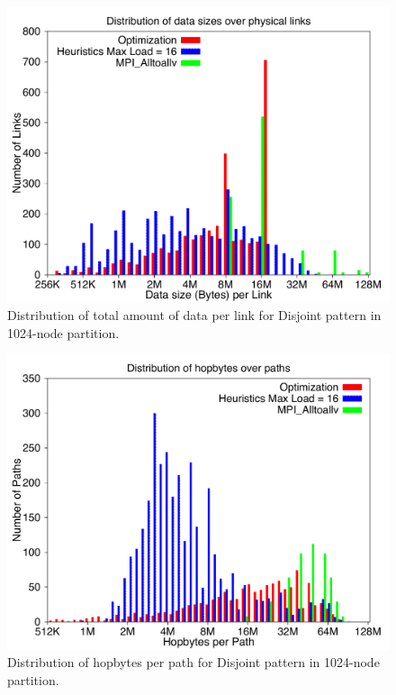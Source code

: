 \begin{figure}[!htb]
\vspace{-0.1in}
\centering
\includegraphics[scale=0.30]{figures/loaddata_histo.pdf}
\vspace{-0.1in}
\caption{Distribution of total amount of data per link for Disjoint pattern in 1024-node partition.}
\vspace{-0.1in}
\label{fig:loaddata_histo}
\end{figure}

\begin{figure}[!htb]
\vspace{-0.1in}
\centering
\includegraphics[scale=0.30]{figures/hopbyte_histo.pdf}
\vspace{-0.1in}
\caption{Distribution of hopbytes per path for Disjoint pattern in 1024-node partition.}
\vspace{-0.1in}
\label{fig:hopbyte_histo}
\end{figure}

